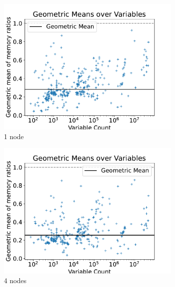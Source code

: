 \documentclass[12pt,a4paper,twoside]{scrartcl}
\numberwithin{equation}{section}
\begin{document}
\begin{figure}[!h]
  \center
  \begin{subfigure}[c]{.45\textwidth}
    \center
    \includegraphics[scale=.45]{plots/1node_compare/mem_gm_over_vars.pdf}
    \caption{1 node}
  \end{subfigure}
  \begin{subfigure}[c]{.45\textwidth}
    \center
    \includegraphics[scale=.45]{plots/4node_compare/mem_gm_over_vars.pdf}
    \caption{4 nodes}
  \end{subfigure}
  \begin{subfigure}[c]{.45\textwidth}
    \center

\end{subfigure}
\end{figure}
\end{document}
